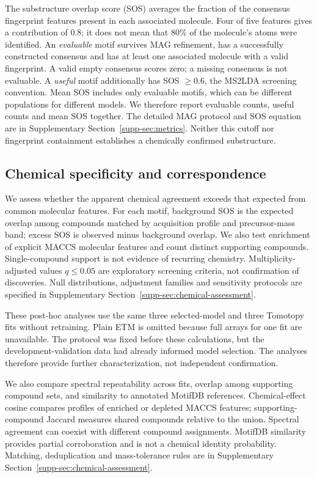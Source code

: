 \documentclass[10pt,a4paper]{article}
\begin{document}
The substructure overlap score (SOS) averages the fraction of the consensus
fingerprint features present in each associated molecule. Four of five
features gives a contribution of 0.8; it does not mean that 80\% of the
molecule's atoms were identified. An \emph{evaluable} motif survives MAG
refinement, has a successfully constructed consensus and has at least one
associated molecule with a valid fingerprint. A valid empty consensus scores
zero; a missing consensus is not evaluable. A \emph{useful} motif additionally
has SOS $\geq0.6$, the MS2LDA screening convention. Mean SOS includes only
evaluable motifs, which can be different populations for different models.
We therefore report evaluable counts, useful counts and mean SOS together.
The detailed MAG protocol and SOS equation are in Supplementary
Section~\ref{supp-sec:metrics}. Neither this cutoff nor fingerprint containment
establishes a chemically confirmed substructure.

\subsection{Chemical specificity and correspondence}
\label{sec:chemical-assessment}

We assess whether the apparent chemical agreement exceeds that expected from
common molecular features. For each motif, background SOS is the expected
overlap among compounds matched by acquisition profile and precursor-mass
band; excess SOS is observed minus background overlap. We also test enrichment
of explicit MACCS molecular features and count distinct supporting compounds.
Single-compound support is not evidence of recurring chemistry. Multiplicity-
adjusted values $q\leq0.05$ are exploratory screening criteria, not confirmation
of discoveries. Null distributions, adjustment families and sensitivity
protocols are specified in Supplementary Section~\ref{supp-sec:chemical-assessment}.

These post-hoc analyses use the same three selected-model and three Tomotopy
fits without retraining. Plain ETM is omitted because full arrays for one
fit are unavailable. The protocol was fixed before these calculations, but
the development-validation data had already informed model selection.
The analyses therefore provide further characterization, not independent
confirmation.

We also compare spectral repeatability across fits, overlap among supporting
compound sets, and similarity to annotated MotifDB references. Chemical-effect
cosine compares profiles of enriched or depleted MACCS features; supporting-
compound Jaccard measures shared compounds relative to the union. Spectral
agreement can coexist with different compound assignments. MotifDB similarity
provides partial corroboration and is not a chemical identity probability.
Matching, deduplication and mass-tolerance rules are in Supplementary
Section~\ref{supp-sec:chemical-assessment}.
\end{document}

